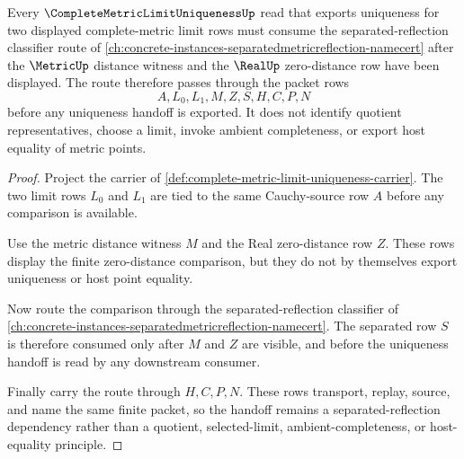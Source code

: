 \begin{theorem}
\label{thm:complete-metric-limit-uniqueness-separated-reflection-route}
Every $\CompleteMetricLimitUniquenessUp$ read that exports uniqueness for two displayed complete-metric limit rows must consume the separated-reflection classifier route of \autoref{ch:concrete-instances-separatedmetricreflection-namecert} after the $\MetricUp$ distance witness and the $\RealUp$ zero-distance row have been displayed. The route therefore passes through the packet rows
$$
A,L_{0},L_{1},M,Z,S,H,C,P,N
$$
before any uniqueness handoff is exported. It does not identify quotient representatives, choose a limit, invoke ambient completeness, or export host equality of metric points.
\end{theorem}
\begin{proof}
Project the carrier of \autoref{def:complete-metric-limit-uniqueness-carrier}. The two limit rows $L_{0}$ and $L_{1}$ are tied to the same Cauchy-source row $A$ before any comparison is available.

Use the metric distance witness $M$ and the Real zero-distance row $Z$. These rows display the finite zero-distance comparison, but they do not by themselves export uniqueness or host point equality.

Now route the comparison through the separated-reflection classifier of \autoref{ch:concrete-instances-separatedmetricreflection-namecert}. The separated row $S$ is therefore consumed only after $M$ and $Z$ are visible, and before the uniqueness handoff is read by any downstream consumer.

Finally carry the route through $H,C,P,N$. These rows transport, replay, source, and name the same finite packet, so the handoff remains a separated-reflection dependency rather than a quotient, selected-limit, ambient-completeness, or host-equality principle.
\end{proof}
